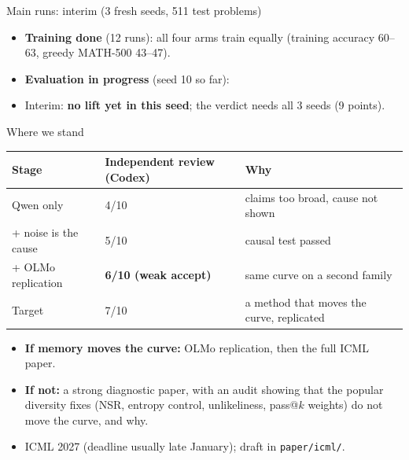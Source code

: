 \documentclass[aspectratio=169,11pt]{beamer}
\begin{document}
\begin{frame}{Main runs: interim (3 fresh seeds, 511 test problems)}
\small
\begin{itemize}
\item \textbf{Training done} (12 runs): all four arms train equally (training accuracy 60--63, greedy MATH-500 43--47).
\item \textbf{Evaluation in progress} (seed 10 so far):
\end{itemize}
\centering
{}
\begin{itemize}
\item Interim: \textbf{no lift yet in this seed}; the verdict needs all 3 seeds (9 points).
\end{itemize}
\end{frame}

\begin{frame}{Where we stand}
\small
\begin{tabular}{@{}lll@{}}
\toprule
Stage & Independent review (Codex) & Why\\
\midrule
Qwen only & 4/10 & claims too broad, cause not shown\\
+ noise is the cause & 5/10 & causal test passed\\
+ OLMo replication & \textbf{6/10 (weak accept)} & same curve on a second family\\
Target & 7/10 & a method that moves the curve, replicated\\
\bottomrule
\end{tabular}
\vspace{6pt}
\begin{itemize}
\item \textbf{If memory moves the curve:} OLMo replication, then the full ICML paper.
\item \textbf{If not:} a strong diagnostic paper, with an audit showing that the popular diversity fixes (NSR, entropy control, unlikeliness, pass@$k$ weights) do not move the curve, and why.
\item ICML 2027 (deadline usually late January); draft in \texttt{paper/icml/}.
\end{itemize}
\end{frame}
\end{document}
